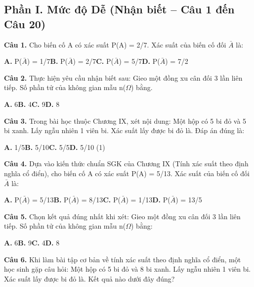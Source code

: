 \documentclass[11pt,a4paper]{article}
\begin{document}
\subsection*{\color{accent} Phần I. Mức độ Dễ (Nhận biết -- Câu 1 đến Câu 20)}
\textbf{\color{primary} Câu 1.} Cho biến cố A có xác suất P(A) = 2/7. Xác suất của biến cố đối $\bar{A}$ là:\par
\hspace*{1.5em}\textbf{A.} P($\bar{A}$) = 1/7\quad\quad \textbf{B.} P($\bar{A}$) = 2/7\quad\quad \textbf{C.} P($\bar{A}$) = 5/7\quad\quad \textbf{D.} P($\bar{A}$) = 7/2\par\vspace{2pt}
\textbf{\color{primary} Câu 2.} Thực hiện yêu cầu nhận biết sau: Gieo một đồng xu cân đối 3 lần liên tiếp. Số phần tử của không gian mẫu n($\Omega$) bằng.\par
\hspace*{1.5em}\textbf{A.} 6\quad\quad \textbf{B.} 4\quad\quad \textbf{C.} 9\quad\quad \textbf{D.} 8\par\vspace{2pt}
\textbf{\color{primary} Câu 3.} Trong bài học thuộc Chương IX, xét nội dung: Một hộp có 5 bi đỏ và 5 bi xanh. Lấy ngẫu nhiên 1 viên bi. Xác suất lấy được bi đỏ là. Đáp án đúng là:\par
\hspace*{1.5em}\textbf{A.} 1/5\quad\quad \textbf{B.} 5/10\quad\quad \textbf{C.} 5/5\quad\quad \textbf{D.} 5/10 (1)\par\vspace{2pt}
\textbf{\color{primary} Câu 4.} Dựa vào kiến thức chuẩn SGK của Chương IX (Tính xác suất theo định nghĩa cổ điển), cho biến cố A có xác suất P(A) = 5/13. Xác suất của biến cố đối $\bar{A}$ là:\par
\hspace*{1.5em}\textbf{A.} P($\bar{A}$) = 5/13\quad\quad \textbf{B.} P($\bar{A}$) = 8/13\quad\quad \textbf{C.} P($\bar{A}$) = 1/13\quad\quad \textbf{D.} P($\bar{A}$) = 13/5\par\vspace{2pt}
\textbf{\color{primary} Câu 5.} Chọn kết quả đúng nhất khi xét: Gieo một đồng xu cân đối 3 lần liên tiếp. Số phần tử của không gian mẫu n($\Omega$) bằng:\par
\hspace*{1.5em}\textbf{A.} 6\quad\quad \textbf{B.} 9\quad\quad \textbf{C.} 4\quad\quad \textbf{D.} 8\par\vspace{2pt}
\textbf{\color{primary} Câu 6.} Khi làm bài tập cơ bản về tính xác suất theo định nghĩa cổ điển, một học sinh gặp câu hỏi: Một hộp có 5 bi đỏ và 8 bi xanh. Lấy ngẫu nhiên 1 viên bi. Xác suất lấy được bi đỏ là. Kết quả nào dưới đây đúng?\par
\end{document}
